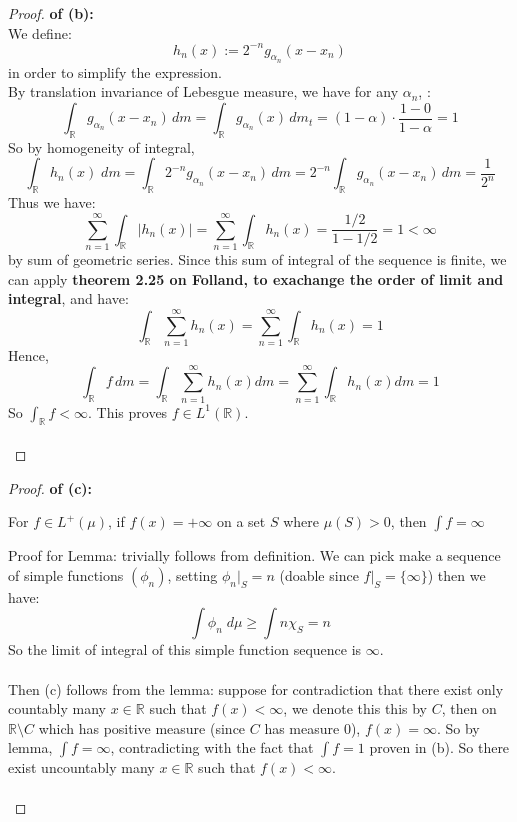 \documentclass[lang=cn,11pt]{elegantbook}
\begin{document}
\begin{proof}
    \textbf{of (b):}\\
    We define: \[
    h_n(x) :=  2^{-n}g_{\alpha_n}(x - x_n)
    \] in order to simplify the expression.\\
By translation invariance of Lebesgue measure, we have for any $\alpha_n$, : \[
     \int_{\mathbb{R}} g_{\alpha_n}(x - x_n)\,dm =
     \int_{\mathbb{R}} g_{\alpha_n}(x)\,d m_t
     = (1-\alpha) \cdot \frac{1 - 0}{1-\alpha} = 1
   \]
So by homogeneity of integral,  \[
\int_{\mathbb{R}} h_n(x) \; d m =  \int_{\mathbb{R}} 2^{-n}g_{\alpha_n}(x - x_n)\,dm = 2^{-n}  \int_{\mathbb{R}} g_{\alpha_n}(x - x_n)\,d m  = \frac{1}{2^n}
\]
Thus we have: \[
\sum_{n=1}^\infty \int_{\mathbb{R}} |h_n(x)| = \sum_{n=1}^\infty \int_{\mathbb{R}} h_n(x) =  \frac{1/2}{1-1/2} = 1 < \infty
\] by sum of geometric series.
Since this sum of integral of the sequence is finite, we can apply \textbf{theorem 2.25 on Folland, to exachange the order of limit and integral}, and have: \[
 \int_{\mathbb{R}}  \sum_{n=1}^\infty h_n(x)   = \sum_{n=1}^\infty \int_{\mathbb{R}} h_n(x)  =1
\]
Hence,
\[
  \int_{\mathbb{R}} f \,d m
 =  \int_{\mathbb{R}}  \sum_{n=1}^\infty h_n(x)   dm = \sum_{n=1}^\infty  \int_{\mathbb{R}}  h_n(x)   dm  = 1
\]
So \(\int_{\mathbb{R}} f < \infty\).  This proves \(f\in L^1(\mathbb{R})\).\\\\
\end{proof}



\begin{proof}
\textbf{of (c):}
\begin{lemma}
    For $f \in L^+(\mu)$,   if $f(x) =+\infty$ on a set $S$ where $\mu(S) >0$, then $\int f = \infty$
\end{lemma}
Proof for Lemma: trivially follows from definition. We can pick make a sequence of simple functions $(\phi_n)$, setting $\phi_n |_S = n$ (doable since $f|_S = \{\infty\}$) then we have: \[
\int \phi_n \; d\mu \geq  \int  n  \chi_S = n
\]
So the limit of integral of this simple function sequence is $\infty$. \\\\
Then (c) follows from the lemma: suppose for contradiction that there exist only countably many $x\in\mathbb{R}$ such that $f(x)<\infty$, we denote this this by $C$, then on $\mathbb{R} \setminus C$ which has positive measure (since $C$ has measure 0), $f(x) = \infty$. So by lemma, $\int f = \infty$, contradicting with the fact that $\int f = 1$ proven in (b). So there exist uncountably many $x\in\mathbb{R}$ such that $f(x)<\infty$.\\\\
\end{proof}
\end{document}
